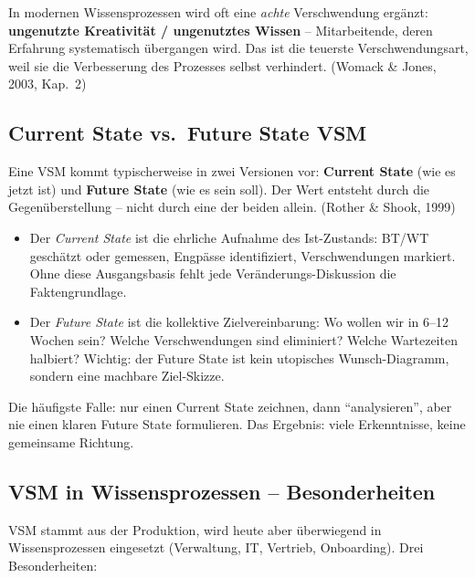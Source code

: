\documentclass[11pt,a4paper,oneside]{article}
\newcommand{\fachbegriff}[1]{\textbf{#1}}
\newcommand{\quelle}[1]{{\footnotesize\color{lpGray}(#1)}}
\begin{document}
\medskip

\noindent In modernen Wissensprozessen wird oft eine \emph{achte} Verschwendung ergänzt: \fachbegriff{ungenutzte Kreativität / ungenutztes Wissen} -- Mitarbeitende, deren Erfahrung systematisch übergangen wird. Das ist die teuerste Verschwendungsart, weil sie die Verbesserung des Prozesses selbst verhindert. \quelle{Womack \& Jones, 2003, Kap.~2}

\subsection{Current State vs.\ Future State VSM}

Eine VSM kommt typischerweise in zwei Versionen vor: \fachbegriff{Current State} (wie es jetzt ist) und \fachbegriff{Future State} (wie es sein soll). Der Wert entsteht durch die Gegenüberstellung -- nicht durch eine der beiden allein. \quelle{Rother \& Shook, 1999}

\begin{itemize}
  \item Der \emph{Current State} ist die ehrliche Aufnahme des Ist-Zustands: BT/WT geschätzt oder gemessen, Engpässe identifiziert, Verschwendungen markiert. Ohne diese Ausgangsbasis fehlt jede Veränderungs-Diskussion die Faktengrundlage.
  \item Der \emph{Future State} ist die kollektive Zielvereinbarung: Wo wollen wir in 6--12 Wochen sein? Welche Verschwendungen sind eliminiert? Welche Wartezeiten halbiert? Wichtig: der Future State ist kein utopisches Wunsch-Diagramm, sondern eine machbare Ziel-Skizze.
\end{itemize}

Die häufigste Falle: nur einen Current State zeichnen, dann ``analysieren'', aber nie einen klaren Future State formulieren. Das Ergebnis: viele Erkenntnisse, keine gemeinsame Richtung.

\subsection{VSM in Wissensprozessen -- Besonderheiten}

VSM stammt aus der Produktion, wird heute aber überwiegend in Wissensprozessen eingesetzt (Verwaltung, IT, Vertrieb, Onboarding). Drei Besonderheiten:
\end{document}
